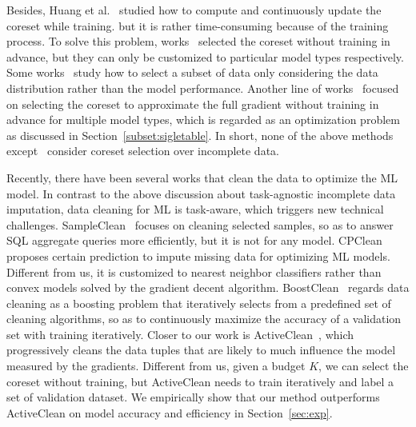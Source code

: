 %
Besides, 
  Huang et al.~\cite{DBLP:conf/icml/HuangHLFD21} studied how to compute and continuously update the coreset while training. %
but it is rather time-consuming because of the training process. 
 To solve this problem, works~\cite{DBLP:conf/icml/CampbellB18, DBLP:journals/corr/BravermanFL16}   selected the coreset without training in advance, but they can only be customized to particular model types respectively. %
 Some works~\cite{sener2017active,chen2012super} study how to select a subset of data only considering the data distribution rather than   the model performance.
 Another line of works~\cite{DBLP:conf/icml/MirzasoleimanBL20,  recon, fastcore, DBLP:conf/emnlp/KirchhoffB14} focused on selecting the coreset to approximate the full gradient without training in advance for multiple model types, which is regarded as an optimization problem as discussed in Section~\ref{subset:sigletable}.
In short, none of the above methods except~\cite{goodcore}  consider coreset selection over incomplete data.

 Recently, there have  been several works that clean the data to optimize the ML model. 
In contrast to the above discussion about task-agnostic incomplete data imputation, data cleaning for ML is task-aware, which triggers new technical challenges.
SampleClean~\cite{DBLP:journals/debu/KrishnanWFGKM015} focuses on cleaning selected samples, so as to answer  SQL aggregate  queries  more efficiently, but it is not for any model.
%
 CPClean~\cite{DBLP:journals/pvldb/KarlasLWGC0020} proposes certain prediction to impute missing data for optimizing ML models. Different from us, it is customized to nearest neighbor classifiers rather than convex models solved by the gradient decent algorithm. 
  BoostClean~\cite{DBLP:journals/corr/abs-1711-01299} regards data cleaning as a boosting problem that iteratively
 selects from a predefined set of cleaning algorithms, so as to continuously maximize the accuracy of  a validation set with training iteratively. 
Closer to our work is ActiveClean~\cite{DBLP:journals/pvldb/KrishnanWWFG16}, which progressively cleans the data tuples that are likely to much influence the model   measured by the gradients. 
Different from us,  given a budget $K$, we can select the coreset without training, but ActiveClean needs to train iteratively  and label a set of   validation  dataset.  We empirically show that our method outperforms ActiveClean on model accuracy and efficiency in Section~\ref{sec:exp}.


